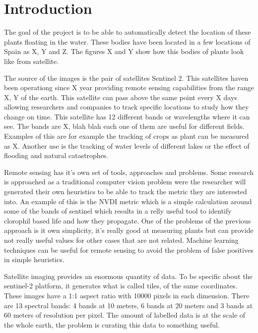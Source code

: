 \documentclass[conference]{IEEEtran}
\begin{document}
    \section{Introduction}
    The goal of the project is to be able to automatically detect the location of these plants
    floating in the water.
    These bodies have been located in a few locations of Spain as X, Y and Z. The figures X and Y
    show how this bodies of plants look like from satellite.

    The source of the images is the pair of satellites Sentinel 2. This satellites haven been operationg since X year
    providing remote sensing capabilities from the range X, Y of the earth.
    This satellite can pass above the same point every X days allowing researchers and companies to
    track specific locations to study how they change on time.
    This satellite has 12 different bands or wavelengths where it can see. The bands are X, blah blah
    each one of them are useful for different fields.
    Examples of this are for example the tracking of crops as plant can be measured as X.
    Another use is the tracking of water levels of different lakes or the effect of flooding and
    natural catastrophes.

    Remote sensing has it's own set of tools, approaches and problems.
    Some research is approached as a traditional computer vision problem were the researcher will
    generated their own heuristics to be able to track the metric they are interested into.
    An example of this is the NVDI metric which is a simple calculation around some of the bands of
    sentinel which results in a relly useful tool to identify clorophil based life and how they
    propagate.
    One of the problems of the previous approach is it own simplicity, it's really good at measuring
    plants but can provide not really useful values for other cases that are not related.
    Machine learning techniques can be useful for remote sensing to avoid the problem of false
    positives in simple heuristics.

    Satellite imaging provides an enormous quantity of data.
    To be specific about the sentinel-2 platform, it generates what is called tiles, of the same coordinates.
    These images have a 1:1 aspect ratio with 10000 pixels in each dimension.
    There are 13 spectral bands: 4 bands at 10 meters, 6 bands at 20 meters and 3 bands at 60 meters of
    resolution per pixel.
    The amount of labelled data is at the scale of the whole earth, the problem is curating this
    data to something useful.
\end{document}
